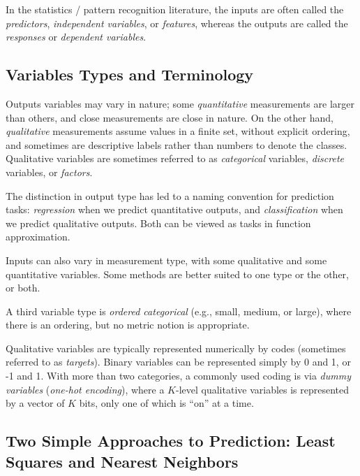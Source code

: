 \documentclass{article}
\numberwithin{equation}{section}
\begin{document}
In the statistics / pattern recognition literature, the inputs are often called the \textit{predictors}, \textit{independent variables}, or \textit{features}, whereas the outputs are called the \textit{responses} or \textit{dependent variables}.

\subsection{Variables Types and Terminology}

Outputs variables may vary in nature; some \textit{quantitative} measurements are larger than others, and close measurements are close in nature. On the other hand, \textit{qualitative} measurements assume values in a finite set, without explicit ordering, and sometimes are descriptive labels rather than numbers to denote the classes. Qualitative variables are sometimes referred to as \textit{categorical} variables, \textit{discrete} variables, or \textit{factors}.

The distinction in output type has led to a naming convention for prediction tasks: \textit{regression} when we predict quantitative outputs, and \textit{classification} when we predict qualitative outputs. Both can be viewed as tasks in function approximation.

Inputs can also vary in measurement type, with some qualitative and some quantitative variables. Some methods are better suited to one type or the other, or both.

A third variable type is \textit{ordered categorical} (e.g., small, medium, or large), where there is an ordering, but no metric notion is appropriate.

Qualitative variables are typically represented numerically by codes (sometimes referred to as \textit{targets}). Binary variables can be represented simply by 0 and 1, or -1 and 1. With more than two categories, a commonly used coding is via \textit{dummy variables} (\textit{one-hot encoding}), where a $K$-level qualitative variables is represented by a vector of $K$ bits, only one of which is ``on'' at a time.

\subsection{Two Simple Approaches to Prediction: Least Squares and Nearest Neighbors}
\end{document}
